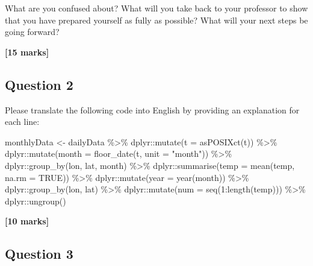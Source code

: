 \documentclass[
  10t,
]{article}
\newenvironment{Shaded}{\begin{snugshade}}{\end{snugshade}}
\newcommand{\AttributeTok}[1]{\textcolor[rgb]{0.40,0.45,0.13}{#1}}
\newcommand{\ConstantTok}[1]{\textcolor[rgb]{0.56,0.35,0.01}{#1}}
\newcommand{\DecValTok}[1]{\textcolor[rgb]{0.68,0.00,0.00}{#1}}
\newcommand{\FunctionTok}[1]{\textcolor[rgb]{0.28,0.35,0.67}{#1}}
\newcommand{\NormalTok}[1]{\textcolor[rgb]{0.00,0.23,0.31}{#1}}
\newcommand{\OtherTok}[1]{\textcolor[rgb]{0.00,0.23,0.31}{#1}}
\newcommand{\SpecialCharTok}[1]{\textcolor[rgb]{0.37,0.37,0.37}{#1}}
\newcommand{\StringTok}[1]{\textcolor[rgb]{0.13,0.47,0.30}{#1}}
\begin{document}
What are you confused about? What will you take back to your professor
to show that you have prepared yourself as fully as possible? What will
your next steps be going forward?

\textbf{{[}15 marks{]}}

\subsection{Question 2}\label{question-2}

Please translate the following code into English by providing an
explanation for each line:

\begin{Shaded}
\begin{Highlighting}[]
\NormalTok{monthlyData }\OtherTok{\textless{}{-}}\NormalTok{ dailyData }\SpecialCharTok{\%\textgreater{}\%}
\NormalTok{    dplyr}\SpecialCharTok{::}\FunctionTok{mutate}\NormalTok{(}\AttributeTok{t =} \FunctionTok{asPOSIXct}\NormalTok{(t)) }\SpecialCharTok{\%\textgreater{}\%}
\NormalTok{    dplyr}\SpecialCharTok{::}\FunctionTok{mutate}\NormalTok{(}\AttributeTok{month =} \FunctionTok{floor\_date}\NormalTok{(t, }\AttributeTok{unit =} \StringTok{"month"}\NormalTok{)) }\SpecialCharTok{\%\textgreater{}\%}
\NormalTok{    dplyr}\SpecialCharTok{::}\FunctionTok{group\_by}\NormalTok{(lon, lat, month) }\SpecialCharTok{\%\textgreater{}\%}
\NormalTok{    dplyr}\SpecialCharTok{::}\FunctionTok{summarise}\NormalTok{(}\AttributeTok{temp =} \FunctionTok{mean}\NormalTok{(temp, }\AttributeTok{na.rm =} \ConstantTok{TRUE}\NormalTok{)) }\SpecialCharTok{\%\textgreater{}\%}
\NormalTok{    dplyr}\SpecialCharTok{::}\FunctionTok{mutate}\NormalTok{(}\AttributeTok{year =} \FunctionTok{year}\NormalTok{(month)) }\SpecialCharTok{\%\textgreater{}\%}
\NormalTok{    dplyr}\SpecialCharTok{::}\FunctionTok{group\_by}\NormalTok{(lon, lat) }\SpecialCharTok{\%\textgreater{}\%}
\NormalTok{    dplyr}\SpecialCharTok{::}\FunctionTok{mutate}\NormalTok{(}\AttributeTok{num =} \FunctionTok{seq}\NormalTok{(}\DecValTok{1}\SpecialCharTok{:}\FunctionTok{length}\NormalTok{(temp))) }\SpecialCharTok{\%\textgreater{}\%}
\NormalTok{    dplyr}\SpecialCharTok{::}\FunctionTok{ungroup}\NormalTok{()}
\end{Highlighting}
\end{Shaded}

\textbf{{[}10 marks{]}}

\subsection{Question 3}\label{question-3}
\end{document}
